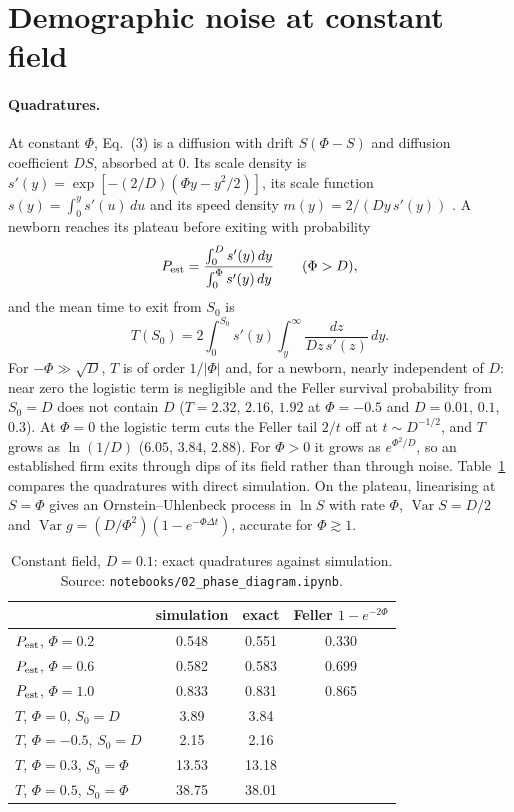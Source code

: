 \documentclass[pre,onecolumn,superscriptaddress,nofootinbib]{revtex4-2}
\newcommand{\Var}{\operatorname{Var}}
\begin{document}
\section{Demographic noise at constant field}
\label{sec:constant}

\paragraph{Quadratures.}  At constant $\Phi$, Eq.~(3) is a diffusion with drift $S(\Phi-S)$ and diffusion
coefficient $DS$, absorbed at $0$.  Its scale density is $s'(y)=\exp[-(2/D)(\Phi y-y^2/2)]$, its scale function
$s(y)=\int_0^ys'(u)\,du$ and its speed density $m(y)=2/(Dy\,s'(y))$ \cite{karlintaylor1981}.  A newborn reaches its plateau before exiting with
probability
\begin{equation}
P_{\rm est}=\frac{\int_0^Ds'(y)\,dy}{\int_0^\Phi s'(y)\,dy}\qquad(\Phi>D),
\end{equation}
and the mean time to exit from $S_0$ is
\begin{equation}
T(S_0)=2\int_0^{S_0}s'(y)\int_y^\infty\frac{dz}{Dz\,s'(z)}\,dy .
\end{equation}
For $-\Phi\gg\sqrt D$, $T$ is of order $1/|\Phi|$ and, for a newborn, nearly independent of $D$: near zero the
logistic term is negligible and the Feller survival probability from $S_0=D$ does not contain $D$ ($T=2.32$,
$2.16$, $1.92$ at $\Phi=-0.5$ and $D=0.01$, $0.1$, $0.3$).  At $\Phi=0$ the logistic term cuts the Feller tail
$2/t$ off at $t\sim D^{-1/2}$, and $T$ grows as $\ln(1/D)$ ($6.05$, $3.84$, $2.88$).  For
$\Phi>0$ it grows as $e^{\Phi^2/D}$, so an established firm exits through dips of its field rather than
through noise.  Table~\ref{tab:constant} compares the quadratures with direct simulation.  On the
plateau, linearising at $S=\Phi$ gives an Ornstein--Uhlenbeck process in $\ln S$ with rate $\Phi$, $\Var
S=D/2$ and $\Var g=(D/\Phi^2)(1-e^{-\Phi\Delta t})$, accurate for $\Phi\gtrsim1$.

\begin{table}[h]
\caption{Constant field, $D=0.1$: exact quadratures against simulation.  Source:
\texttt{notebooks/02\_phase\_diagram.ipynb}.}
\label{tab:constant}
\begin{ruledtabular}
\begin{tabular}{lccc}
 & simulation & exact & Feller $1-e^{-2\Phi}$\\
\hline
$P_{\rm est}$, $\Phi=0.2$ & 0.548 & 0.551 & 0.330\\
$P_{\rm est}$, $\Phi=0.6$ & 0.582 & 0.583 & 0.699\\
$P_{\rm est}$, $\Phi=1.0$ & 0.833 & 0.831 & 0.865\\
$T$, $\Phi=0$, $S_0=D$ & 3.89 & 3.84 & \\
$T$, $\Phi=-0.5$, $S_0=D$ & 2.15 & 2.16 & \\
$T$, $\Phi=0.3$, $S_0=\Phi$ & 13.53 & 13.18 & \\
$T$, $\Phi=0.5$, $S_0=\Phi$ & 38.75 & 38.01 & \\
\end{tabular}
\end{ruledtabular}
\end{table}
\end{document}
